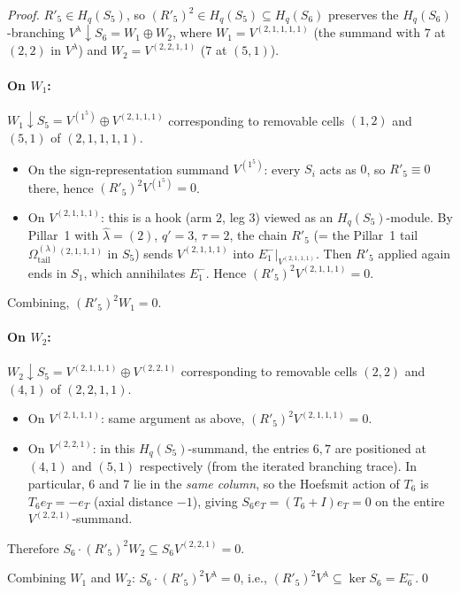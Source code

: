 \documentclass[11pt]{article}
\theoremstyle{definition}
\newcommand{\Hq}{H_q}
\newcommand{\Vlam}{V^\lambda}
\newcommand{\Omtail}{\Omega^{(\lambda)}_{\mathrm{tail}}}
\newcommand{\hatl}{\widehat\lambda}
\newcommand{\Rp}{R'}
\newcommand{\Eminus}[1]{E^-_{#1}}
\begin{document}
\begin{proof}
$\Rp_5 \in \Hq(S_5)$, so $(\Rp_5)^2 \in \Hq(S_5) \subseteq \Hq(S_6)$ preserves the
$\Hq(S_6)$-branching $\Vlam \downarrow S_6 = W_1 \oplus W_2$, where
$W_1 = V^{(2,1,1,1,1)}$ (the summand with $7$ at $(2,2)$ in $\Vlam$) and
$W_2 = V^{(2,2,1,1)}$ ($7$ at $(5,1)$).

\paragraph{On $W_1$:}
$W_1 \downarrow S_5 = V^{(1^5)} \oplus V^{(2,1,1,1)}$ corresponding to removable
cells $(1,2)$ and $(5,1)$ of $(2,1,1,1,1)$.
\begin{itemize}[topsep=0.2em,itemsep=0.1em]
\item On the sign-representation summand $V^{(1^5)}$: every $S_i$ acts as $0$, so
   $\Rp_5 \equiv 0$ there, hence $(\Rp_5)^2 V^{(1^5)} = 0$.
\item On $V^{(2,1,1,1)}$: this is a hook (arm $2$, leg $3$) viewed as an $\Hq(S_5)$-module.
   By Pillar~1 with $\hatl = (2)$, $q' = 3$, $\tau = 2$, the chain $\Rp_5$ (= the
   Pillar~1 tail $\Omtail^{(2,1,1,1)}$ in $S_5$) sends $V^{(2,1,1,1)}$ into
   $\Eminus 1|_{V^{(2,1,1,1)}}$. Then $\Rp_5$ applied again ends in $S_1$, which
   annihilates $\Eminus 1$. Hence $(\Rp_5)^2 V^{(2,1,1,1)} = 0$.
\end{itemize}
Combining, $(\Rp_5)^2 W_1 = 0$.

\paragraph{On $W_2$:}
$W_2 \downarrow S_5 = V^{(2,1,1,1)} \oplus V^{(2,2,1)}$ corresponding to removable
cells $(2,2)$ and $(4,1)$ of $(2,2,1,1)$.
\begin{itemize}[topsep=0.2em,itemsep=0.1em]
\item On $V^{(2,1,1,1)}$: same argument as above, $(\Rp_5)^2 V^{(2,1,1,1)} = 0$.
\item On $V^{(2,2,1)}$: in this $\Hq(S_5)$-summand, the entries $6, 7$ are
   positioned at $(4,1)$ and $(5,1)$ respectively (from the iterated branching trace).
   In particular, $6$ and $7$ lie in the \emph{same column}, so the Hoefsmit
   action of $T_6$ is $T_6 e_T = -e_T$ (axial distance $-1$), giving
   $S_6 e_T = (T_6 + I) e_T = 0$ on the entire $V^{(2,2,1)}$-summand.
\end{itemize}
Therefore $S_6 \cdot (\Rp_5)^2 W_2 \subseteq S_6 V^{(2,2,1)} = 0$.

Combining $W_1$ and $W_2$: $S_6 \cdot (\Rp_5)^2 \Vlam = 0$, i.e.,
$(\Rp_5)^2 \Vlam \subseteq \ker S_6 = \Eminus 6$.\qed
\end{proof}
\end{document}
